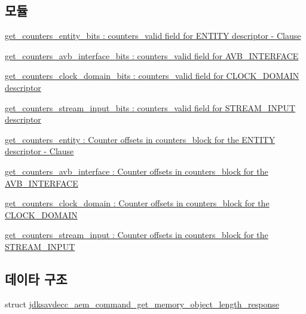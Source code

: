\subsection*{모듈}
\begin{DoxyCompactItemize}
\item 
\hyperlink{group__get__counters__entity__bits}{get\+\_\+counters\+\_\+entity\+\_\+bits \+: counters\+\_\+valid field for E\+N\+T\+I\+T\+Y descriptor -\/ Clause}
\item 
\hyperlink{group__get__counters__avb__interface__bits}{get\+\_\+counters\+\_\+avb\+\_\+interface\+\_\+bits \+: counters\+\_\+valid field for A\+V\+B\+\_\+\+I\+N\+T\+E\+R\+F\+A\+CE}
\item 
\hyperlink{group__get__counters__clock__domain__bits}{get\+\_\+counters\+\_\+clock\+\_\+domain\+\_\+bits \+: counters\+\_\+valid field for C\+L\+O\+C\+K\+\_\+\+D\+O\+M\+A\+I\+N descriptor}
\item 
\hyperlink{group__get__counters__stream__input__bits}{get\+\_\+counters\+\_\+stream\+\_\+input\+\_\+bits \+: counters\+\_\+valid field for S\+T\+R\+E\+A\+M\+\_\+\+I\+N\+P\+U\+T descriptor}
\item 
\hyperlink{group__get__counters__entity}{get\+\_\+counters\+\_\+entity \+: Counter offsets in counters\+\_\+block for the E\+N\+T\+I\+T\+Y descriptor -\/ Clause}
\item 
\hyperlink{group__get__counters__avb__interface}{get\+\_\+counters\+\_\+avb\+\_\+interface \+: Counter offsets in counters\+\_\+block for the A\+V\+B\+\_\+\+I\+N\+T\+E\+R\+F\+A\+CE}
\item 
\hyperlink{group__get__counters__clock__domain}{get\+\_\+counters\+\_\+clock\+\_\+domain \+: Counter offsets in counters\+\_\+block for the C\+L\+O\+C\+K\+\_\+\+D\+O\+M\+A\+IN}
\item 
\hyperlink{group__get__counters__stream__input}{get\+\_\+counters\+\_\+stream\+\_\+input \+: Counter offsets in counters\+\_\+block for the S\+T\+R\+E\+A\+M\+\_\+\+I\+N\+P\+UT}
\end{DoxyCompactItemize}
\subsection*{데이타 구조}
\begin{DoxyCompactItemize}
\item 
struct \hyperlink{structjdksavdecc__aem__command__get__memory__object__length__response}{jdksavdecc\+\_\+aem\+\_\+command\+\_\+get\+\_\+memory\+\_\+object\+\_\+length\+\_\+response}
\end{DoxyCompactItemize}
